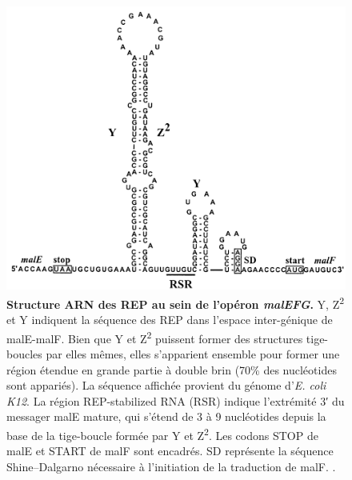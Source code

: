 \documentclass[12pt,a4paper]{report}
\begin{document}
\begin{onehalfspace}
\begin{figure}[ht]
\centerline{\includegraphics[scale=0.5]{figures/malEF_rep.png}}
\caption{\textbf{Structure ARN des REP au sein de l’opéron \textit{malEFG}.} Y, Z\textsuperscript{2} et Y indiquent la séquence des REP dans l'espace inter-génique de malE-malF. Bien que Y et Z\textsuperscript{2} puissent former des structures tige-boucles par elles mêmes, elles s'apparient ensemble pour former une région étendue en grande partie à double brin (70\% des nucléotides sont appariés). La séquence affichée provient du génome d'\textit{E. coli K12}. La région REP-stabilized RNA (RSR) indique l'extrémité 3′ du messager malE mature, qui s'étend de 3 à 9 nucléotides depuis la base de la tige-boucle formée par Y et Z\textsuperscript{2}. Les codons STOP de  malE et START de malF sont encadrés. SD représente la séquence Shine–Dalgarno nécessaire à l'initiation de la traduction de malF. \citep{Khemici2004}.}
\label{fig:malEF_rep} 
\end{figure}


\end{onehalfspace}
\end{document}

